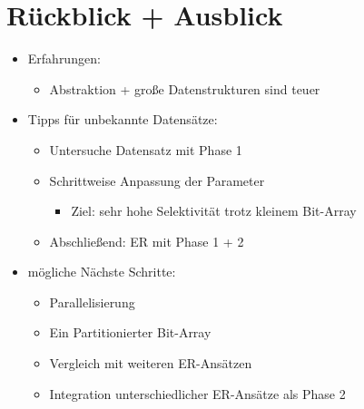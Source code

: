 \section{Rückblick + Ausblick}

\begin{frame}
	\begin{itemize}
		\setlength\itemsep{\stdItemSep}
		\item Erfahrungen:
		\begin{itemize}
			\setlength\itemsep{\stdItemSep}
			\vspace*{\stdItemSep}
			\item Abstraktion + große Datenstrukturen sind teuer
		\end{itemize}
		\item Tipps für unbekannte Datensätze:
		\begin{itemize}
			\setlength\itemsep{\stdItemSep}
			\vspace*{\stdItemSep}
			\item Untersuche Datensatz mit \glqq Phase 1\grqq
			\item Schrittweise Anpassung der Parameter
			\begin{itemize}
				\setlength\itemsep{\stdItemSep}
				\vspace*{\stdItemSep}
				\item Ziel: sehr hohe Selektivität trotz kleinem Bit-Array
			\end{itemize}
			\item Abschließend: ER mit \glqq Phase 1 + 2\grqq
		\end{itemize}
		\item mögliche Nächste Schritte:
		\begin{itemize}
			\setlength\itemsep{\stdItemSep}
			\vspace*{\stdItemSep}
			\item Parallelisierung
			\item Ein Partitionierter Bit-Array
			\item Vergleich mit weiteren ER-Ansätzen
			\item Integration unterschiedlicher ER-Ansätze als \glqq Phase 2\grqq
		\end{itemize}
	\end{itemize}
\end{frame}
